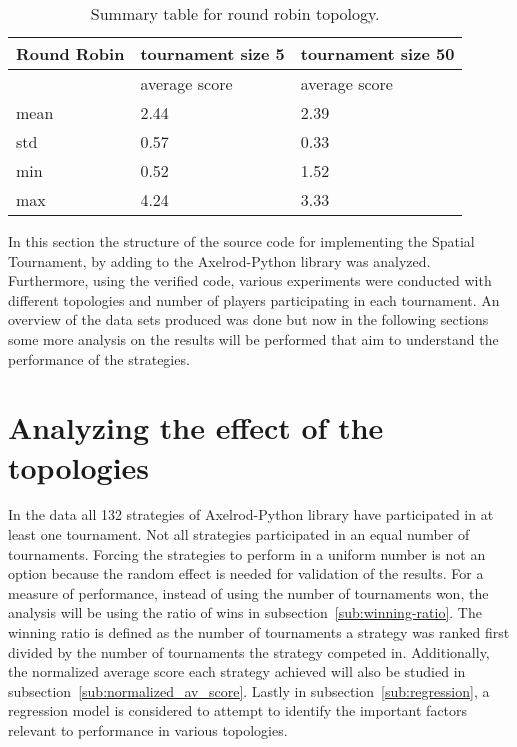 \begin{table}[H]
\centering
\begin{tabular}{|l|l|l|}
\hline
Round Robin & \multicolumn{1}{c|}{tournament size 5} & \multicolumn{1}{c|}{tournament size 50} \\ \hline

            & average score        & average score             \\ \hline
mean        & 2.44                 & 2.39                  \\ \hline
std         & 0.57                 & 0.33                  \\ \hline
min         & 0.52                 & 1.52                  \\ \hline
max         & 4.24                 & 3.33                  \\ \hline
\end{tabular}
\caption{Summary table for round robin topology.}
\label{sum-rr}
\end{table}

In this section the structure of the source code for implementing the Spatial
Tournament, by adding to the Axelrod-Python library was analyzed. Furthermore,
using the verified code, various experiments were conducted with different
topologies
and number of players participating in each tournament. An overview of the
data sets produced was done but now in the following sections
some more analysis on the results will be performed that aim to understand
the performance of the strategies.


\section{Analyzing the effect of the topologies}
\label{sub:analyzing_the_effect_of_the_topologies}

In the data all 132 strategies of Axelrod-Python library have participated in at
least one tournament. Not all strategies participated in an equal number of tournaments.
Forcing the strategies to perform in a uniform number is
not an option because the random effect is needed for validation of the
results. For a measure of
performance, instead of using the number of tournaments won, the analysis will
be using the ratio of wins in subsection~\ref{sub:winning-ratio}.
The winning ratio is defined as the number of tournaments a strategy was ranked
first divided by the number of tournaments the strategy competed in.
Additionally, the normalized average score each strategy
achieved will also be studied in subsection~\ref{sub:normalized_av_score}.
Lastly in subsection~\ref{sub:regression}, a regression model is considered to
attempt to identify the important factors relevant to performance in various
topologies.


